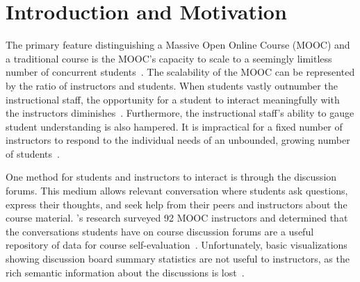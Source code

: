 \documentclass[sigconf, anonymous]{acmart}
\begin{document}

%

%

%
\maketitle

\section{Introduction and Motivation}
The primary feature distinguishing a Massive Open Online Course (MOOC) and a traditional course is the MOOC's capacity to scale to a seemingly limitless number of concurrent students~\cite{pappano2012year}.
The scalability of the MOOC can be represented by the ratio of instructors and students.
When students vastly outnumber the instructional staff, the opportunity for a student to interact meaningfully with the instructors diminishes~\cite{huang2014superposter}.
Furthermore, the instructional staff's ability to gauge student understanding is also hampered.
It is impractical for a fixed number of instructors to respond to the individual needs of an unbounded, growing number of students~\cite{mackness2010ideals}.

One method for students and instructors to interact is through the discussion forums.
This medium allows relevant conversation where students ask questions, express their thoughts, and seek help from their peers and instructors about the course material.
\citeauthor{stephens2014monitoring}'s research surveyed 92 MOOC instructors and determined that the conversations students have on course discussion forums are a useful repository of data for course self-evaluation~\cite{stephens2014monitoring}.
Unfortunately, basic visualizations showing discussion board summary statistics are not useful to instructors, as the rich semantic information about the discussions is lost~\cite{stephens2014monitoring}.
\end{document}
